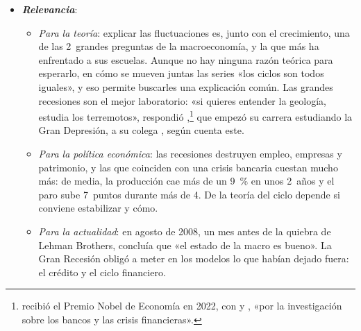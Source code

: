 \documentclass[11pt]{article}
\begin{document}
\begin{itemize}
\item \textbf{\emph{Relevancia}}:
  \begin{itemize}
  \item \emph{Para la teoría}: explicar las fluctuaciones es, junto con el crecimiento, una de las 2~grandes preguntas de la macroeconomía, y la que más ha enfrentado a sus escuelas. Aunque no hay ninguna razón teórica para esperarlo, en cómo se mueven juntas las series «los ciclos son todos iguales», y eso permite buscarles una explicación común\nocite{Lucas1977Understanding}. Las grandes recesiones son el mejor laboratorio: «si quieres entender la geología, estudia los terremotos», respondió ,\footnote{ recibió el Premio Nobel de Economía en 2022, con  y , «por la investigación sobre los bancos y las crisis financieras»\nocite{Nobel2022}.} que empezó su carrera estudiando la Gran Depresión, a su colega , según cuenta este\nocite{Ip2005Bernanke}.
  \item \emph{Para la política económica}: las recesiones destruyen empleo, empresas y patrimonio, y las que coinciden con una crisis bancaria cuestan mucho más: de media, la producción cae más de un 9~\% en unos 2~años y el paro sube 7~puntos durante más de 4\nocite{ReinhartRogoff2009Aftermath}. De la teoría del ciclo depende si conviene estabilizar y cómo.
  \item \emph{Para la actualidad}: en agosto de 2008, un mes antes de la quiebra de Lehman Brothers,  concluía que «el estado de la macro es bueno»\nocite{Blanchard2009State}. La Gran Recesión obligó a meter en los modelos lo que habían dejado fuera: el crédito y el ciclo financiero.
  \end{itemize}


\end{itemize}
\end{document}
